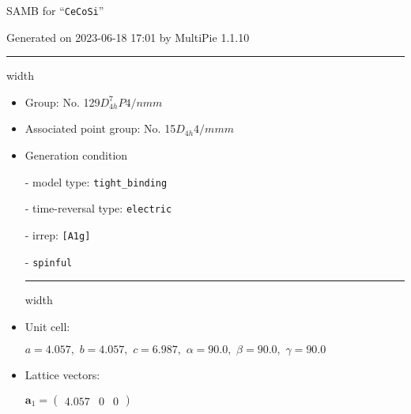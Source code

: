\documentclass[fleqn,10pt,landscape]{article}
\begin{document}
\setcounter{MaxMatrixCols}{16}

\setlength{\baselineskip}{16pt}
\footnotesize
\begin{center}
\LARGE
SAMB for ``\texttt{CeCoSi}''
\end{center}
\begin{flushright}
Generated on 2023-06-18 17:01 by MultiPie 1.1.10
\end{flushright}
\vspace{1cm}


 \hfil \hrule height 1mm width \textwidth \hfil

\begin{itemize}
\item Group: No. 129\quad$D_{4h}^{7}$\quad$P4/nmm$\quad[ tetragonal ]

\item Associated point group: No. 15\quad$D_{4h}$\quad$4/mmm$\quad[ tetragonal ]

\vspace{5mm}

\item Generation condition

\quad - model type: \texttt{tight_binding}

\quad - time-reversal type: \texttt{electric}

\quad - irrep: \texttt{[A1g]}

\quad - \texttt{spinful}


 \hfil \hrule height 1mm width \textwidth \hfil

\item Unit cell:

\quad $a=4.057,\,\, b=4.057,\,\, c=6.987,\,\, \alpha=90.0,\,\, \beta=90.0,\,\, \gamma=90.0$

\item Lattice vectors:

\quad $\bm{a}_1=\begin{pmatrix} 4.057 & 0 & 0 \end{pmatrix}$


\end{itemize}
\end{document}
